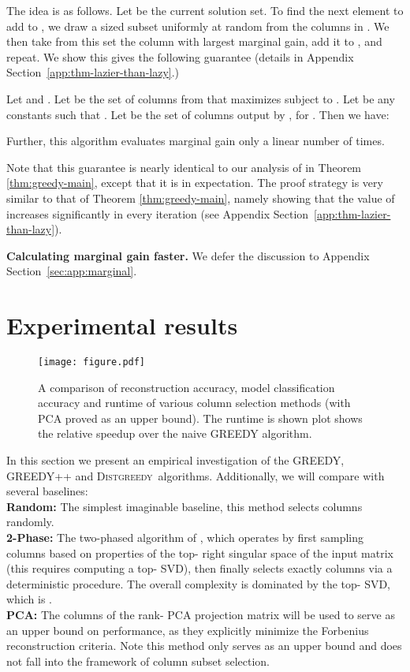 \documentclass{article}
\newcommand{\distgreedy}{\textsc{Distgreedy}}
\begin{document}
The idea is as follows. Let  be the current solution set. To find the next element to add to , we draw a sized  subset uniformly at random from the columns in . We then take from this set the column with largest marginal gain, add it to , and repeat. We show this gives the following guarantee (details in Appendix Section~\ref{app:thm-lazier-than-lazy}.)

\begin{thm} \label{thm-lazier-than-lazy:main}
Let  and . Let  be the set of columns from  that maximizes  subject to . Let  be any constants such that . Let  be the set of columns output by , for . Then we have:

Further, this algorithm evaluates marginal gain only a linear number  of times.
\end{thm}

Note that this guarantee is nearly identical to our analysis of  in Theorem \ref{thm:greedy-main}, except that it is in expectation. The proof strategy is very similar to that of Theorem \ref{thm:greedy-main}, namely showing that the value of  increases significantly in every iteration (see Appendix Section~\ref{app:thm-lazier-than-lazy}).

{\bf Calculating marginal gain faster.} We defer the discussion to Appendix Section~\ref{sec:app:marginal}. 


\section{Experimental results}\label{section-6}

\begin{figure*}[t]
\centering
\texttt{[image: figure.pdf]}
\caption{A comparison of reconstruction accuracy, model classification
accuracy and runtime of various column selection methods (with PCA
proved as an upper bound). The runtime is shown plot shows the
relative speedup over the naive GREEDY algorithm.}
\label{fig}
\end{figure*}

In this section we present an empirical investigation of
the GREEDY, GREEDY++ and \distgreedy\ algorithms.
Additionally, we will compare with several baselines:
\\
    {\bf Random:}
    The simplest imaginable baseline, this method selects
    columns randomly. \\
{\bf 2-Phase:}
    The two-phased algorithm of \cite{Boutsidis2}, which
operates by first sampling  columns based on
properties of the top- right singular space of the input matrix
(this requires computing a top- SVD), then finally selects exactly
 columns via a deterministic procedure. The overall complexity is
dominated by the top- SVD, which is . \\
{\bf PCA:}
    The columns of the rank- PCA projection matrix will be
used to serve as an upper bound on performance, as they explicitly
minimize the Forbenius reconstruction criteria. Note this method only
serves as an upper bound and does not fall into  the framework of
column subset selection.
\end{document}
